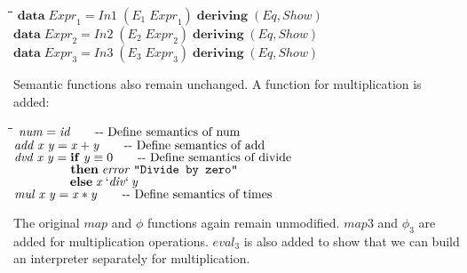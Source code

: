 \documentclass[10pt]{article}
\newlength{\lwidth}\setlength{\lwidth}{4.5cm}
\newlength{\cwidth}\setlength{\cwidth}{8mm} %
\newcommand{\Conid}[1]{\mathit{#1}}
\newcommand{\Varid}[1]{\mathit{#1}}
\begin{document}
\begin{tabbing}
\qquad\=\hspace{\lwidth}\=\hspace{\cwidth}\=\+\kill
${\mathbf{data}\;\Varid{Expr}_1\mathrel{=}\Conid{In1}\;(\Varid{E}_1\;\Varid{Expr}_1)\;\mathbf{deriving}\;(\Conid{Eq},\Conid{Show})}$\\
${}$\\
${\mathbf{data}\;\Varid{Expr}_2\mathrel{=}\Conid{In2}\;(\Varid{E}_2\;\Varid{Expr}_2)\;\mathbf{deriving}\;(\Conid{Eq},\Conid{Show})}$\\
${}$\\
${\mathbf{data}\;\Varid{Expr}_3\mathrel{=}\Conid{In3}\;(\Varid{E}_3\;\Varid{Expr}_3)\;\mathbf{deriving}\;(\Conid{Eq},\Conid{Show})}$
\end{tabbing}
Semantic functions also remain unchanged.  A function for
multiplication is added:

\begin{tabbing}
\qquad\=\hspace{\lwidth}\=\hspace{\cwidth}\=\+\kill
${\Varid{num}\mathrel{=}\Varid{id}\mbox{\qquad-{}-  Define semantics of num}}$\\
${\Varid{add}\;\Varid{x}\;\Varid{y}\mathrel{=}\Varid{x}\mathbin{+}\Varid{y}\mbox{\qquad-{}-  Define semantics of add}}$\\
${\Varid{dvd}\;\Varid{x}\;\Varid{y}\mathrel{=}\mathbf{if}\;\Varid{y}\equiv \mathrm{0}\mbox{\qquad-{}-  Define semantics of divide}}$\\
${\phantom{\Varid{dvd}\;\Varid{x}\;\Varid{y}\mathrel{=}\mbox{}}\mathbf{then}\;\Varid{error}\;\text{\tt \char34 Divide~by~zero\char34}}$\\
${\phantom{\Varid{dvd}\;\Varid{x}\;\Varid{y}\mathrel{=}\mbox{}}\mathbf{else}\;\Varid{x}\mathbin{\Varid{`div`}}\Varid{y}}$\\
${\Varid{mul}\;\Varid{x}\;\Varid{y}\mathrel{=}\Varid{x}\mathbin{*}\Varid{y}\mbox{\qquad-{}-  Define semantics of times}}$
\end{tabbing}
The original \ensuremath{\Varid{map}} and \ensuremath{\Varid{\phi}} functions again remain unmodified.
\ensuremath{\Varid{map3}} and \ensuremath{\Varid{\phi_3}} are added for multiplication operations.  \ensuremath{\Varid{eval}_3} is
also added to show that we can build an interpreter separately for
multiplication.
\end{document}
